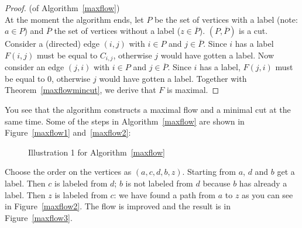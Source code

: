 \begin{proof} (of Algorithm~\ref{maxflow})\\
At the moment the algorithm ends, let $P$ be the set of vertices with
a label (note: $a \in P$) and $\overline{P}$ the set of vertices
without a label ($z \in \overline{P}$). $(P,\overline{P})$ is a cut.
Consider a (directed) edge $(i,j)$ with $i \in P$ and $j \in
\overline{P}$.  Since $i$ has a label $F(i,j)$ must be equal to
$C_{i,j}$, otherwise $j$ would have gotten a label. Now consider an
edge $(j,i)$ with $i \in P$ and $j \in \overline{P}$. Since $i$ has a
label, $F(j,i)$ must be equal to 0, otherwise $j$ would have gotten a
label. Together with Theorem~\ref{maxflowmincut}, we derive that $F$
is maximal.
\end{proof}

You see that the algorithm constructs a maximal flow
and a minimal cut at the same time. Some of the steps in Algorithm~\ref{maxflow} are
shown in Figure~\ref{maxflow1} and~\ref{maxflow2}:

\begin{figure}[ht]
\begin{center}
\hspace{1cm} 
\end{center}
\caption{Illustration 1 for Algorithm~\ref{maxflow}}
\end{figure}

Choose the order on the vertices as $(a,c,d,b,z)$. Starting from $a$,
$d$ and $b$ get a label. Then $c$ is labeled from $d$; $b$ is not
labeled from $d$ because $b$ has already a label. Then $z$ is labeled
from $c$: we have found a path from $a$ to $z$ as you can see in
Figure~\ref{maxflow2}. The flow is improved and the result is in
Figure~\ref{maxflow3}.

